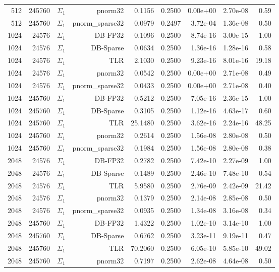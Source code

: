\begin{tabular}{|r|r|r|r|r|r|r|r|r|}
  512 & 245760 & $\Sigma_1$ & pnorm32 & 0.1156 & 0.2500 & 0.00e+00 & 2.70e-08 & 0.59 \\
  512 & 245760 & $\Sigma_1$ & pnorm\_sparse32 & 0.0979 & 0.2497 & 3.72e-04 & 1.36e-08 & 0.50 \\
  1024 & 24576 & $\Sigma_1$ & DB-FP32 & 0.1096 & 0.2500 & 8.74e-16 & 3.00e-15 & 1.00 \\
  1024 & 24576 & $\Sigma_1$ & DB-Sparse & 0.0634 & 0.2500 & 1.36e-16 & 1.28e-16 & 0.58 \\
  1024 & 24576 & $\Sigma_1$ & TLR & 2.1030 & 0.2500 & 9.23e-16 & 8.01e-16 & 19.18 \\
  1024 & 24576 & $\Sigma_1$ & pnorm32 & 0.0542 & 0.2500 & 0.00e+00 & 2.71e-08 & 0.49 \\
  1024 & 24576 & $\Sigma_1$ & pnorm\_sparse32 & 0.0433 & 0.2500 & 0.00e+00 & 2.71e-08 & 0.40 \\
  1024 & 245760 & $\Sigma_1$ & DB-FP32 & 0.5212 & 0.2500 & 7.05e-16 & 2.36e-15 & 1.00 \\
  1024 & 245760 & $\Sigma_1$ & DB-Sparse & 0.3105 & 0.2500 & 1.12e-16 & 4.63e-17 & 0.60 \\
  1024 & 245760 & $\Sigma_1$ & TLR & 25.1480 & 0.2500 & 3.62e-16 & 2.24e-16 & 48.25 \\
  1024 & 245760 & $\Sigma_1$ & pnorm32 & 0.2614 & 0.2500 & 1.56e-08 & 2.80e-08 & 0.50 \\
  1024 & 245760 & $\Sigma_1$ & pnorm\_sparse32 & 0.1984 & 0.2500 & 1.56e-08 & 2.80e-08 & 0.38 \\
  2048 & 24576 & $\Sigma_1$ & DB-FP32 & 0.2782 & 0.2500 & 7.42e-10 & 2.27e-09 & 1.00 \\
  2048 & 24576 & $\Sigma_1$ & DB-Sparse & 0.1489 & 0.2500 & 2.46e-10 & 7.48e-10 & 0.54 \\
  2048 & 24576 & $\Sigma_1$ & TLR & 5.9580 & 0.2500 & 2.76e-09 & 2.42e-09 & 21.42 \\
  2048 & 24576 & $\Sigma_1$ & pnorm32 & 0.1379 & 0.2500 & 2.14e-08 & 2.85e-08 & 0.50 \\
  2048 & 24576 & $\Sigma_1$ & pnorm\_sparse32 & 0.0935 & 0.2500 & 1.34e-08 & 3.16e-08 & 0.34 \\
  2048 & 245760 & $\Sigma_1$ & DB-FP32 & 1.4322 & 0.2500 & 1.02e-10 & 3.14e-10 & 1.00 \\
  2048 & 245760 & $\Sigma_1$ & DB-Sparse & 0.6762 & 0.2500 & 3.23e-11 & 9.19e-11 & 0.47 \\
  2048 & 245760 & $\Sigma_1$ & TLR & 70.2060 & 0.2500 & 6.05e-10 & 5.85e-10 & 49.02 \\
  2048 & 245760 & $\Sigma_1$ & pnorm32 & 0.7197 & 0.2500 & 2.62e-08 & 4.64e-08 & 0.50 \\

\end{tabular}
